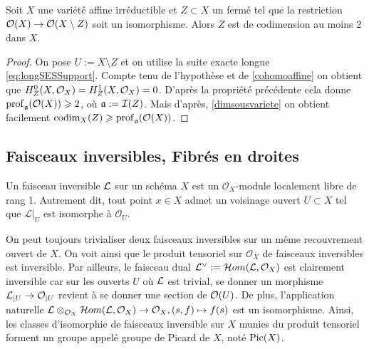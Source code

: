 \begin{cor}\label{cohomcodimgeq2}
Soit $X$ une variété affine irréductible et $Z\subset X$ un fermé tel que la restriction $\mathcal{O}(X)\rightarrow \mathcal{O}(X\setminus Z)$ soit un isomorphisme. Alors $Z$ est de codimension au moins $2$ dans $X$.
\end{cor}
\begin{proof}
On pose $U:=X\setminus Z$ et on utilise la suite exacte longue \ref{eq:longSESSupport}. Compte tenu de l'hypothèse et de \ref{cohomoaffine} on obtient que $H^0_Z(X,\mathcal{O}_X)=H^1_Z(X,\mathcal{O}_X)=0$. D'après la propriété précédente cela donne $\operatorname{prof}_\mathfrak{a}(\mathcal{O}(X))\geqslant 2$, où $\mathfrak{a}:=\mathcal{I}(Z)$. Mais d'après, \ref{dimsousvariete} on obtient facilement $\operatorname{codim}_X(Z)\geqslant \operatorname{prof}_\mathfrak{a}(\mathcal{O}(X))$.
\end{proof}


\subsection{Faisceaux inversibles, Fibrés en droites}
\begin{defn}
Un faisceau inversible $\mathcal{L}$ sur un schéma $X$ est un $\mathcal{O}_X$-module localement libre de rang 1. Autrement dit, tout point $x\in X$ admet un voisinage ouvert $U \subset X$ tel que ${\mathcal L}|_U$ est isomorphe à ${\mathcal O}_U$.
\end{defn}

On peut toujours trivialiser deux faisceaux inversibles sur un même recouvrement ouvert de $X$. On voit ainsi que le produit tensoriel sur $\mathcal{O}_X$ de faisceaux inversibles est inversible. Par ailleurs, le faisceau dual $\mathcal{L}^\vee:=\mathcal{H} om(\mathcal{L},\mathcal{O}_X)$ est clairement inversible car sur les ouverts $U$ où $\mathcal{L}$ est trivial, se donner un morphisme $\mathcal{L}_{|U}\rightarrow\mathcal{O}_{|U}$ revient à se donner une section de $\mathcal{O}(U)$. De plus, l'application naturelle $\mathcal{L}\otimes_{\mathcal{O}_X} \mathcal{H} om(\mathcal{L},\mathcal{O}_X)\rightarrow \mathcal{O}_X, (s,f)\mapsto f(s)$ est un isomorphisme. Ainsi, les classes d'isomorphie de faisceaux inversible sur $X$ munies du produit tensoriel forment un groupe appelé groupe de Picard de $X$, noté $\operatorname{Pic}(X)$. 

